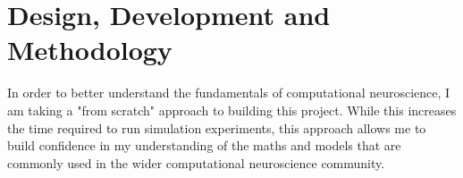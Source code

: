 \chapter{Design, Development and Methodology}

In order to better understand the fundamentals of computational neuroscience, I
am taking a "from scratch" approach to building this project. While this
increases the time required to run simulation experiments, this approach allows
me to build confidence in my understanding of the maths and models that are
commonly used in the wider computational neuroscience community.




